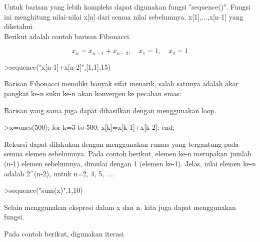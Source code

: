 \documentclass[a4paper,10pt]{article}
\begin{document}
\begin{eulernotebook}
\begin{eulercomment}
\begin{eulercomment}
\begin{eulercomment}
\begin{eulercomment}
\begin{eulercomment}
\begin{eulercomment}
\begin{eulercomment}
\begin{eulercomment}
\begin{eulercomment}
\begin{eulercomment}
\begin{eulercomment}
\begin{eulercomment}
\begin{eulercomment}
\begin{eulercomment}
\begin{eulercomment}
\begin{eulercomment}
\begin{eulercomment}
Untuk barisan yang lebih kompleks dapat digunakan fungsi "sequence()". Fungsi ini menghitung
nilai-nilai x[n] dari semua nilai sebelumnya, x[1],...,x[n-1] yang diketahui.\\
Berikut adalah contoh barisan Fibonacci.

\end{eulercomment}
\begin{eulerformula}
\[
x_n = x_{n-1}+x_{n-2}, \quad x_1=1, \quad x_2 =1
\]
\end{eulerformula}
\begin{eulerprompt}
>sequence("x[n-1]+x[n-2]",[1,1],15)
\end{eulerprompt}
\begin{euleroutput}
  [1,  1,  2,  3,  5,  8,  13,  21,  34,  55,  89,  144,  233,  377,  610]
\end{euleroutput}
\begin{eulercomment}
Barisan Fibonacci memiliki banyak sifat menarik, salah satunya adalah akar pangkat ke-n suku
ke-n akan konvergen ke pecahan emas:
\end{eulercomment}
\begin{eulercomment}
Barisan yang sama juga dapat dihasilkan dengan menggunakan loop.
\end{eulercomment}
\begin{eulerprompt}
>x=ones(500); for k=3 to 500; x[k]=x[k-1]+x[k-2]; end;
\end{eulerprompt}
\begin{eulercomment}
Rekursi dapat dilakukan dengan menggunakan rumus yang tergantung pada semua elemen
sebelumnya. Pada contoh berikut, elemen ke-n merupakan jumlah (n-1) elemen sebelumnya,
dimulai dengan 1 (elemen ke-1). Jelas, nilai elemen ke-n adalah 2\textasciicircum{}(n-2), untuk n=2, 4, 5,
....
\end{eulercomment}
\begin{eulerprompt}
>sequence("sum(x)",1,10)
\end{eulerprompt}
\begin{euleroutput}
  [1,  1,  2,  4,  8,  16,  32,  64,  128,  256]
\end{euleroutput}
\begin{eulercomment}
Selain menggunakan ekspresi dalam x dan n, kita juga dapat menggunakan fungsi.

Pada contoh berikut, digunakan iterasi


\end{eulercomment}
\end{eulercomment}
\end{eulercomment}
\end{eulercomment}
\end{eulercomment}
\end{eulercomment}
\end{eulercomment}
\end{eulercomment}
\end{eulercomment}
\end{eulercomment}
\end{eulercomment}
\end{eulercomment}
\end{eulercomment}
\end{eulercomment}
\end{eulercomment}
\end{eulercomment}
\end{eulercomment}
\end{eulernotebook}
\end{document}
